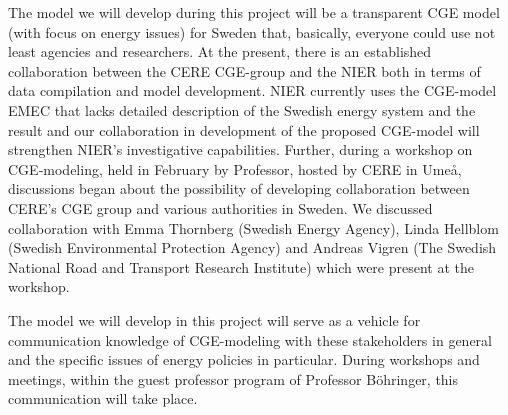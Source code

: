 The model we will develop during this project will be a transparent CGE model (with focus on energy issues) for Sweden that, basically, everyone could use not least agencies and researchers. At the present, there is an established collaboration between the CERE CGE-group and the NIER both in terms of data compilation and model development. NIER currently uses the CGE-model EMEC that lacks detailed description of the Swedish energy system and the result and our collaboration in development of the proposed CGE-model will strengthen NIER's investigative capabilities. Further, during a workshop on CGE-modeling, held in February by Professor, hosted by CERE in Umeå, discussions began about the possibility of developing collaboration between CERE's CGE group and various authorities in Sweden. We discussed collaboration with Emma Thornberg (Swedish Energy Agency), Linda Hellblom (Swedish Environmental Protection Agency) and Andreas Vigren (The Swedish National Road and Transport Research Institute) which were present at the workshop.

The model we will develop in this project will serve as a vehicle for communication knowledge of CGE-modeling with these stakeholders in general and the specific issues of energy policies in particular. During workshops and meetings, within the guest professor program of Professor Böhringer, this communication will take place.


